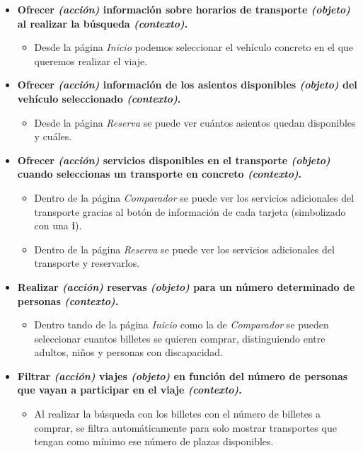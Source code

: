 \begin{itemize}
    \item \textbf{Ofrecer \textit{(acción)} información sobre horarios de transporte \textit{(objeto)} al realizar la búsqueda \textit{(contexto)}.}
        \begin{itemize}
            \item Desde la página \textit{Inicio} podemos seleccionar el vehículo concreto en el que queremos realizar el viaje.
        \end{itemize}

    \item \textbf{Ofrecer \textit{(acción)} información de los asientos disponibles \textit{(objeto)} del vehículo seleccionado \textit{(contexto)}.}
        \begin{itemize}
            \item Desde la página \textit{Reserva} se puede ver cuántos asientos quedan disponibles y cuáles.
        \end{itemize}
    
    \item \textbf{Ofrecer \textit{(acción)} servicios disponibles en el transporte \textit{(objeto)} cuando seleccionas un transporte
        en concreto \textit{(contexto)}.}
        \begin{itemize}
            \item Dentro de la página \textit{Comparador} se puede ver los servicios adicionales del transporte gracias al
                botón de información de cada tarjeta (simbolizado con una \textbf{i}).
            \item Dentro de la página \textit{Reserva} se puede ver los servicios adicionales del transporte y reservarlos.
        \end{itemize}

    
    \item \textbf{Realizar \textit{(acción)} reservas \textit{(objeto)} para un número determinado de personas \textit{(contexto)}.}
        \begin{itemize}
            \item Dentro tando de la página \textit{Inicio} como la de \textit{Comparador} se pueden seleccionar cuantos billetes se
                quieren comprar, distinguiendo entre adultos, niños y personas con discapacidad.
        \end{itemize}

    \item \textbf{Filtrar \textit{(acción)} viajes \textit{(objeto)} en función del número de personas que vayan a participar en el viaje \textit{(contexto)}.}
        \begin{itemize}
            \item Al realizar la búsqueda con los billetes con el número de billetes a comprar, se filtra automáticamente para solo mostrar transportes
                que tengan como mínimo ese número de plazas disponibles.
        \end{itemize}


\end{itemize}

